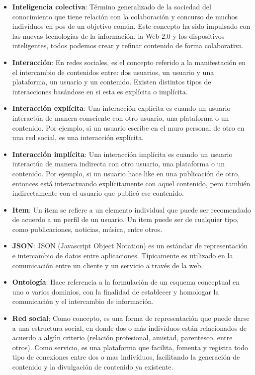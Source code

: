 \begin{itemize}
	\item \textbf{Inteligencia colectiva}: Término generalizado de la sociedad del conocimiento que tiene relación con la colaboración y concurso de muchos indivíduos en pos de un objetivo común. Este concepto ha sido impulsado con las nuevas tecnologías de la información, la Web 2.0 y los dispositivos inteligentes, todos podemos crear y refinar contenido de forma colaborativa.
	\item \textbf{Interacción}: En redes sociales, es el concepto referido a la manifestación en el intercambio de contenidos entre: dos usuarios, un usuario y una plataforma, un usuario y un contenido. Existen distintos tipos de interacciones basándose en si esta es explícita o implícita.
	\item \textbf{Interacción explícita}: Una interacción explícita es cuando un usuario interactúa de manera consciente con otro usuario, una plataforma o un contenido. Por ejemplo, si un usuario escribe en el muro personal de otro en una red social, es una interacción explícita.
	\item \textbf{Interacción implícita}: Una interacción implícita es cuando un usuario interactúa de manera indirecta con otro usuario, una plataforma o un contenido. Por ejemplo, si un usuario hace like en una publicación de otro, entonces está interactuando explícitamente con aquel contenido, pero también indirectamente con el usuario que publicó ese contenido.
	\item \textbf{Item}: Un item se refiere a un elemento individual que puede ser recomendado de acuerdo a un perfil de un usuario. Un item puede ser de cualquier tipo, como publicaciones, noticias, música, entre otros.
	\item \textbf{JSON}: JSON (Javascript Object Notation) es un estándar de representación e intercambio de datos entre aplicaciones. Típicamente es utilizado en la comunicación entre un cliente y un servicio a través de la web. 
	\item \textbf{Ontología}: Hace referencia a la formulación de un esquema conceptual en uno o varios dominios, con la finalidad de establecer y homologar la comunicación y el intercambio de información.
	\item \textbf{Red social}: Como concepto, es una forma de representación que puede darse a una estructura social, en donde dos o más indivíduos están relacionados de acuerdo a algún criterio (relación profesional, amistad, parentesco, entre otros). Como servicio, es una plataforma que facilita, fomenta y registra todo tipo de conexiones entre dos o mas indivíduos, facilitando la generación de contenido y la divulgación de contenido ya existente.

\end{itemize}
